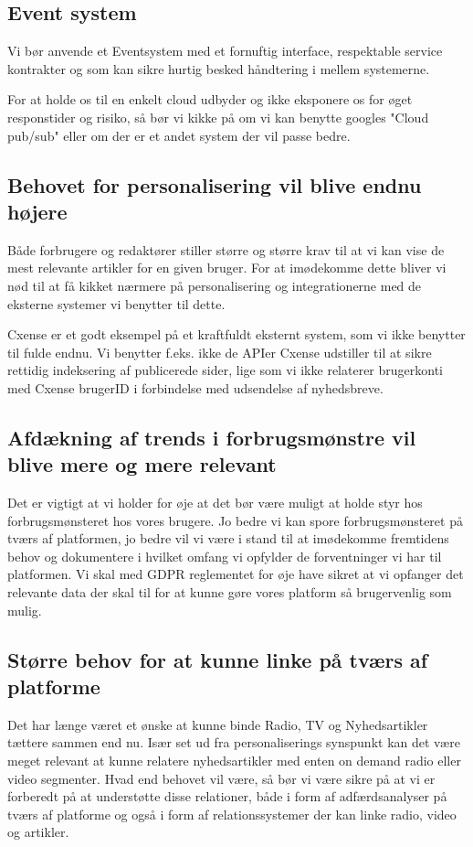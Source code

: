 \documentclass{article}
\begin{document}
\subsection{Event system}
Vi bør anvende et Eventsystem med et fornuftig interface, respektable service kontrakter og som kan sikre hurtig besked håndtering i mellem systemerne.

For at holde os til en enkelt cloud udbyder og ikke eksponere os for øget responstider og risiko, så bør vi kikke på om vi kan benytte googles "Cloud pub/sub" eller om der er et andet system der vil passe bedre.


\subsection{Behovet for personalisering vil blive endnu højere}
Både forbrugere og redaktører stiller større og større krav til at vi kan vise de mest relevante artikler for en given bruger. For at imødekomme dette bliver vi nød til at få kikket nærmere på personalisering og integrationerne med de eksterne systemer vi benytter til dette.

Cxense er et godt eksempel på et kraftfuldt eksternt system, som vi ikke benytter til fulde endnu. Vi benytter f.eks. ikke de APIer Cxense  udstiller til at sikre rettidig indeksering af publicerede sider, lige som vi ikke relaterer brugerkonti med Cxense brugerID i forbindelse med udsendelse af nyhedsbreve.


\subsection{Afdækning af trends i forbrugsmønstre vil blive mere og mere relevant}
Det er vigtigt at vi holder for øje at det bør være muligt at holde styr hos forbrugsmønsteret hos vores brugere. Jo bedre vi kan spore forbrugsmønsteret på tværs af platformen, jo bedre vil vi være i stand til at imødekomme fremtidens behov og dokumentere i hvilket omfang vi opfylder de forventninger vi har til platformen.
Vi skal med GDPR reglementet for øje have sikret at vi opfanger det relevante data der skal til for at kunne gøre vores platform så brugervenlig som mulig.


\subsection{Større behov for at kunne linke på tværs af platforme}
Det har længe været et ønske at kunne binde Radio, TV og Nyhedsartikler tættere sammen end nu. Især set ud fra personaliserings synspunkt kan det være meget relevant at kunne relatere nyhedsartikler med enten on demand radio eller video segmenter.
Hvad end behovet vil være, så bør vi være sikre på at vi er forberedt på at understøtte disse relationer, både i form af adfærdsanalyser på tværs af platforme og også i form af relationssystemer der kan linke radio, video og artikler.
\end{document}
